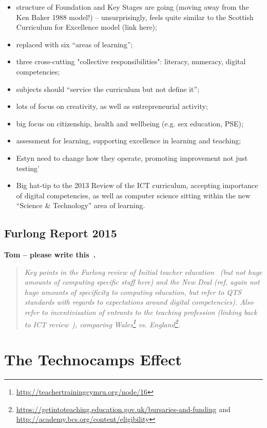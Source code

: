 \documentclass{sig-alternate}
\begin{document}
\begin{itemize}
\item structure of Foundation and Key Stages are going (moving away
  from the Ken Baker 1988 model!) -- unsurprisingly, feels quite
  similar to the Scottish Curriculum for Excellence model (link here);
\item replaced with six ``areas of learning'';
\item three cross-cutting "collective responsibilities": literacy, numeracy, digital competencies;
\item subjects should ``service the curriculum but not define it'';
\item lots of focus on creativity, as well as entrepreneurial activity;
\item big focus on citizenship, health and wellbeing (e.g. sex education, PSE);
\item assessment for learning, supporting excellence in learning and teaching;
\item Estyn need to change how they operate, promoting improvement not just testing'
\item Big hat-tip to the 2013 Review of the ICT curriculum, accepting
  importance of digital competencies, as well as computer science
  sitting within the new ``Science \& Technology'' area of learning.
\end{itemize}

\subsection{Furlong Report 2015}

\textbf{Tom -- please write this~\cite{Furlong:2015}.}

\begin{quote}\it
Key points in the Furlong review of Initial teacher
education~\cite{Furlong:2015} (but not huge amounts of computing
specific stuff here) and the New Deal (ref, again not huge amounts of
specificity to computing education, but refer to QTS standards with
regards to expectations around digital competencies). Also refer to
incentivisation of entrants to the teaching profession (linking back
to ICT review~\cite{welshictreview:2013}), comparing
Wales\footnote{\url{http://teachertrainingcymru.org/node/16}}
vs. England\footnote{\url{https://getintoteaching.education.gov.uk/bursaries-and-funding}
and \url{http://academy.bcs.org/content/eligibility}}.
\end{quote}

\section{The Technocamps Effect}
\end{document}
